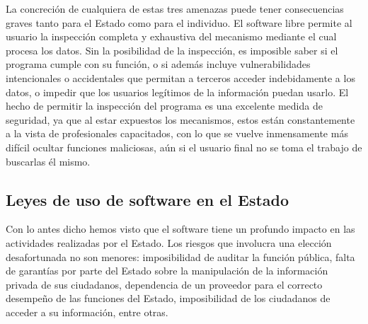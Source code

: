 La concreción de cualquiera de estas tres amenazas puede tener consecuencias graves tanto para el Estado como para el individuo. El software libre permite al usuario la inspección completa y exhaustiva del mecanismo mediante el cual procesa los datos. Sin la posibilidad de la inspección, es imposible saber si el programa cumple con su función, o si además incluye vulnerabilidades intencionales o accidentales que permitan a terceros acceder indebidamente a los datos, o impedir que los usuarios legítimos de la información puedan usarlo. El hecho de permitir la inspección del programa es una excelente medida de seguridad, ya que al estar expuestos los mecanismos, estos están constantemente a la vista de profesionales capacitados, con lo que se vuelve inmensamente más difícil ocultar funciones maliciosas, aún si el usuario final no se toma el trabajo de buscarlas él mismo.


\subsection{Leyes de uso de software en el Estado}

Con lo antes dicho hemos visto que el software tiene un profundo impacto en las actividades realizadas por el Estado. Los riesgos que involucra una elección desafortunada no son menores: imposibilidad de auditar la función pública, falta de garantías por parte del Estado sobre la manipulación de la información privada de sus ciudadanos, dependencia de un proveedor para el correcto desempeño de las funciones del Estado, imposibilidad de los ciudadanos de acceder a su información, entre otras. 

